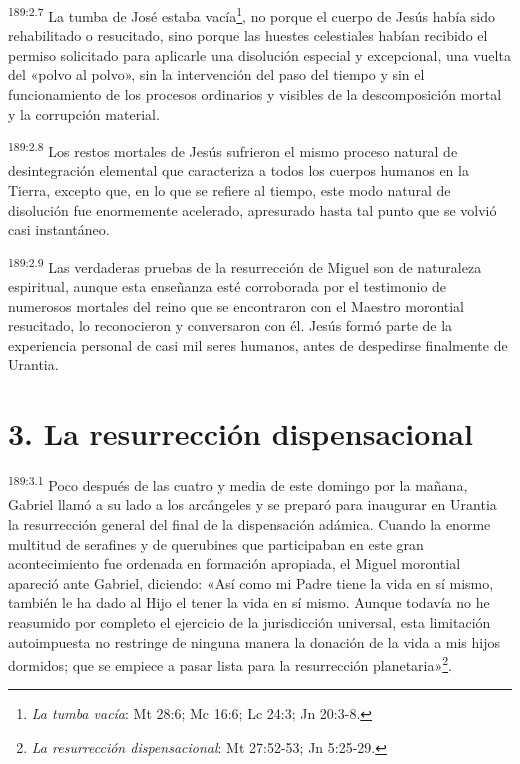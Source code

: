 \par 
\textsuperscript{189:2.7} La tumba de José estaba vacía\footnote{\textit{La tumba vacía}: Mt 28:6; Mc 16:6; Lc 24:3; Jn 20:3-8.}, no porque el cuerpo de Jesús había sido rehabilitado o resucitado, sino porque las huestes celestiales habían recibido el permiso solicitado para aplicarle una disolución especial y excepcional, una vuelta del «polvo al polvo», sin la intervención del paso del tiempo y sin el funcionamiento de los procesos ordinarios y visibles de la descomposición mortal y la corrupción material.

\par 
\textsuperscript{189:2.8} Los restos mortales de Jesús sufrieron el mismo proceso natural de desintegración elemental que caracteriza a todos los cuerpos humanos en la Tierra, excepto que, en lo que se refiere al tiempo, este modo natural de disolución fue enormemente acelerado, apresurado hasta tal punto que se volvió casi instantáneo.

\par 
\textsuperscript{189:2.9} Las verdaderas pruebas de la resurrección de Miguel son de naturaleza espiritual, aunque esta enseñanza esté corroborada por el testimonio de numerosos mortales del reino que se encontraron con el Maestro morontial resucitado, lo reconocieron y conversaron con él. Jesús formó parte de la experiencia personal de casi mil seres humanos, antes de despedirse finalmente de Urantia.

\section*{3. La resurrección dispensacional}
\par 
\textsuperscript{189:3.1} Poco después de las cuatro y media de este domingo por la mañana, Gabriel llamó a su lado a los arcángeles y se preparó para inaugurar en Urantia la resurrección general del final de la dispensación adámica. Cuando la enorme multitud de serafines y de querubines que participaban en este gran acontecimiento fue ordenada en formación apropiada, el Miguel morontial apareció ante Gabriel, diciendo: «Así como mi Padre tiene la vida en sí mismo, también le ha dado al Hijo el tener la vida en sí mismo. Aunque todavía no he reasumido por completo el ejercicio de la jurisdicción universal, esta limitación autoimpuesta no restringe de ninguna manera la donación de la vida a mis hijos dormidos; que se empiece a pasar lista para la resurrección planetaria»\footnote{\textit{La resurrección dispensacional}: Mt 27:52-53; Jn 5:25-29.}.

